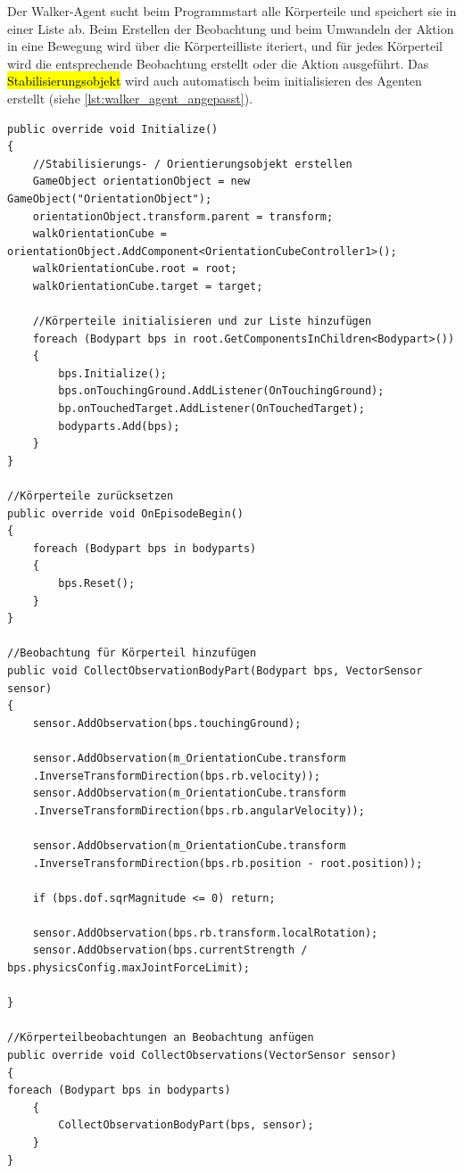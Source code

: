 Der Walker-Agent sucht beim Programmstart alle Körperteile und speichert sie in einer Liste ab. Beim Erstellen der Beobachtung und beim Umwandeln der Aktion in eine Bewegung wird über die Körperteilliste iteriert, und für jedes Körperteil wird die entsprechende Beobachtung erstellt oder die Aktion ausgeführt.
Das \hl{Stabilisierungsobjekt} wird auch automatisch beim initialisieren des Agenten erstellt (siehe \ref{lst:walker_agent_angepasst}).

\begin{lstlisting}[caption={Ausschnitt Angepasstes Walker Agent Skript},captionpos=b,label={lst:walker_agent_angepasst}]
public override void Initialize()
{
    //Stabilisierungs- / Orientierungsobjekt erstellen
    GameObject orientationObject = new GameObject("OrientationObject");
    orientationObject.transform.parent = transform;
    walkOrientationCube = orientationObject.AddComponent<OrientationCubeController1>();
    walkOrientationCube.root = root;
    walkOrientationCube.target = target;

    //Körperteile initialisieren und zur Liste hinzufügen
    foreach (Bodypart bps in root.GetComponentsInChildren<Bodypart>())
    {
        bps.Initialize();
        bps.onTouchingGround.AddListener(OnTouchingGround);
        bp.onTouchedTarget.AddListener(OnTouchedTarget);
        bodyparts.Add(bps);
    }
}

//Körperteile zurücksetzen
public override void OnEpisodeBegin()
{
    foreach (Bodypart bps in bodyparts)
    {
        bps.Reset();
    }
}

//Beobachtung für Körperteil hinzufügen
public void CollectObservationBodyPart(Bodypart bps, VectorSensor sensor)
{
    sensor.AddObservation(bps.touchingGround);

    sensor.AddObservation(m_OrientationCube.transform
    .InverseTransformDirection(bps.rb.velocity));
    sensor.AddObservation(m_OrientationCube.transform
    .InverseTransformDirection(bps.rb.angularVelocity));

    sensor.AddObservation(m_OrientationCube.transform
    .InverseTransformDirection(bps.rb.position - root.position));

    if (bps.dof.sqrMagnitude <= 0) return;

    sensor.AddObservation(bps.rb.transform.localRotation);
    sensor.AddObservation(bps.currentStrength / bps.physicsConfig.maxJointForceLimit);

}

//Körperteilbeobachtungen an Beobachtung anfügen
public override void CollectObservations(VectorSensor sensor)
{
foreach (Bodypart bps in bodyparts)
    {
        CollectObservationBodyPart(bps, sensor);
    }
}


\end{lstlisting}
